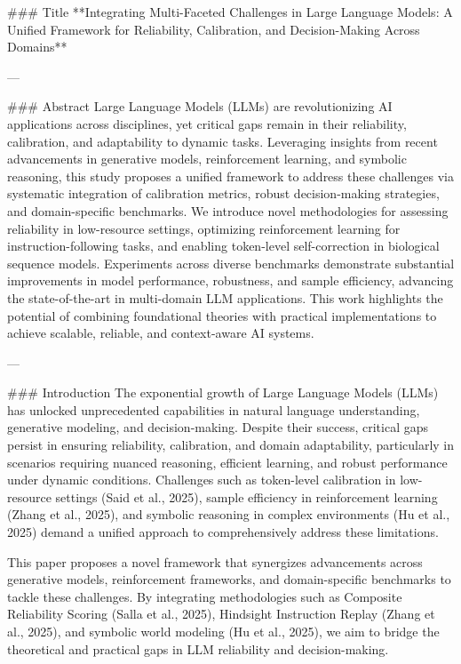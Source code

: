 ### Title
**Integrating Multi-Faceted Challenges in Large Language Models: A Unified Framework for Reliability, Calibration, and Decision-Making Across Domains**

---

### Abstract
Large Language Models (LLMs) are revolutionizing AI applications across disciplines, yet critical gaps remain in their reliability, calibration, and adaptability to dynamic tasks. Leveraging insights from recent advancements in generative models, reinforcement learning, and symbolic reasoning, this study proposes a unified framework to address these challenges via systematic integration of calibration metrics, robust decision-making strategies, and domain-specific benchmarks. We introduce novel methodologies for assessing reliability in low-resource settings, optimizing reinforcement learning for instruction-following tasks, and enabling token-level self-correction in biological sequence models. Experiments across diverse benchmarks demonstrate substantial improvements in model performance, robustness, and sample efficiency, advancing the state-of-the-art in multi-domain LLM applications. This work highlights the potential of combining foundational theories with practical implementations to achieve scalable, reliable, and context-aware AI systems.

---

### Introduction
The exponential growth of Large Language Models (LLMs) has unlocked unprecedented capabilities in natural language understanding, generative modeling, and decision-making. Despite their success, critical gaps persist in ensuring reliability, calibration, and domain adaptability, particularly in scenarios requiring nuanced reasoning, efficient learning, and robust performance under dynamic conditions. Challenges such as token-level calibration in low-resource settings (Said et al., 2025), sample efficiency in reinforcement learning (Zhang et al., 2025), and symbolic reasoning in complex environments (Hu et al., 2025) demand a unified approach to comprehensively address these limitations.

This paper proposes a novel framework that synergizes advancements across generative models, reinforcement frameworks, and domain-specific benchmarks to tackle these challenges. By integrating methodologies such as Composite Reliability Scoring (Salla et al., 2025), Hindsight Instruction Replay (Zhang et al., 2025), and symbolic world modeling (Hu et al., 2025), we aim to bridge the theoretical and practical gaps in LLM reliability and decision-making.

